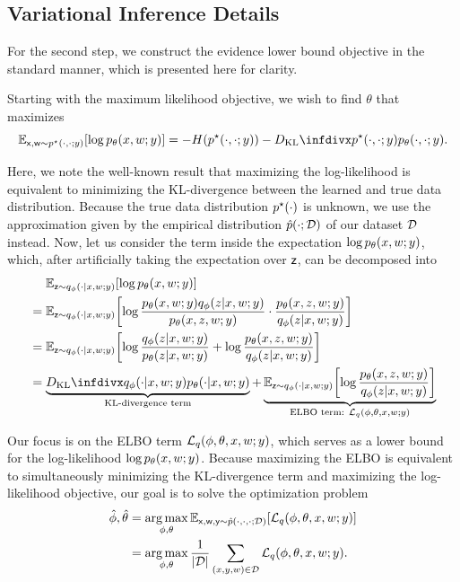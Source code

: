 \subsection{Variational Inference Details}

For the second step, we construct the evidence lower bound objective in the standard manner, which is presented here for clarity. 

\begin{proposition}
    Starting with the maximum likelihood objective, we wish to find $\theta$ that maximizes
    \[
        \EX{\rx,\rw\sim\ptd{\cdot, \cdot;y}}{\log \pld{x,w;y}} = -H(\ptd{\cdot,\cdot;y})-\DKL{\ptd{\cdot,\cdot;y}}{\pld{\cdot,\cdot;y}}.
    \]
\end{proposition}

Here, we note the well-known result that maximizing the log-likelihood is equivalent to minimizing the KL-divergence between the learned and true data distribution. Because the true data distribution $\ptd{\cdot}$ is unknown, we use the approximation given by the empirical distribution $\ped{\cdot;\Data}$ of our dataset $\mathcal D$ instead. Now, let us consider the term inside the expectation $\log \pld{x,w;y}$, which, after artificially taking the expectation over $\mathsf z$, can be decomposed into
\begin{align*}
    &\phantomeq\EX{\rz \sim \qvd{\cdot\given x,w;y} }{\log\pld{x,w;y} } \\
    &= \EX{\rz \sim \qvd{\cdot\given x,w;y} }{\log\frac{\pld{x,w;y}\qvd{z\given x,w;y}}{\pld{x,z, w;y}}\cdot\frac{\pld{x,z,w;y}}{\qvd{z\given x,w;y}} } \\
    &= \EX{\rz \sim \qvd{\cdot\given x,w;y} }{\log\frac{\qvd{z\given x,w;y}}{\pld{z\given x,w;y}}+\log\frac{\pld{x,z,w;y}}{\qvd{z\given x,w;y}}} \\
    &= \underbrace{\DKL{\qvd{\cdot\given x,w;y}}{\pld{\cdot\given x, w;y}}}_{\text{KL-divergence term}} + \underbrace{\EX{\rz \sim \qvd{\cdot\given x,w;y} }{ \log\frac{\pld{x,z,w;y}}{\qvd{z\given x,w;y}}}}_{\text{ELBO term: }\elbo{q}{\phi, \theta, x, w;y}}
\end{align*}

Our focus is on the ELBO term $\elbo{q}{\phi, \theta, x, w;y}$, which serves as a lower bound for the log-likelihood $\log\pld{x,w;y}$. Because maximizing the ELBO is equivalent to simultaneously minimizing the KL-divergence term and maximizing the log-likelihood objective, our goal is to solve the optimization problem
\begin{align*}
    \hat\phi,\hat\theta &= \argmax_{\phi,\theta} \EX{\rx,\rw,\ry \sim\ped{\cdot, \cdot, \cdot; \Data}}{\elbo{q}{\phi,\theta, x,w;y}} \\
    &= \argmax_{\phi,\theta} \frac1{|\Data|} \sum_{(x,y,w)\in \Data} \elbo{q}{\phi,\theta,x,w;y}.
\end{align*}


